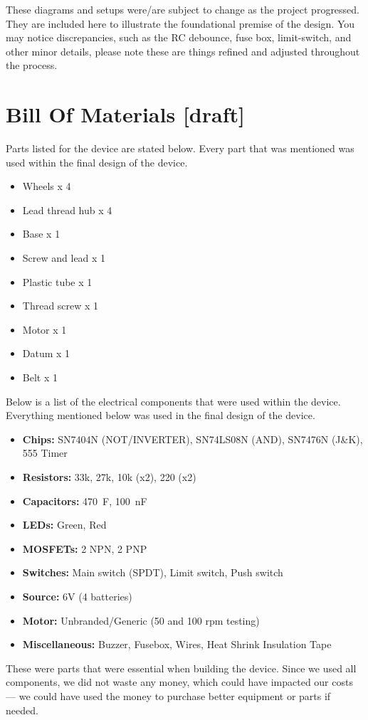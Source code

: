 \documentclass{article}
\begin{document}
These diagrams and setups were/are subject to change as the project progressed. They are included here to illustrate the foundational premise of the design. You may notice discrepancies, such as the RC debounce, fuse box, limit-switch, and other minor details, please note these are things refined and adjusted throughout the process.

\newpage\restoregeometry

\section{Bill Of Materials [draft]}
Parts listed for the device are stated below. Every part that was mentioned was used within the final design of the device.
\begin{itemize}[itemsep=-1mm]
	\item Wheels x 4
	\item Lead thread hub x 4
	\item Base x 1
	\item Screw and lead x 1
	\item Plastic tube x 1
	\item Thread screw x 1
	\item Motor x 1
	\item Datum x 1
	\item Belt x 1
\end{itemize}\noindent
Below is a list of the electrical components that were used within the device. Everything mentioned below was used in the final design of the device.
\begin{itemize}[itemsep=-1mm]
	\item \textbf{Chips:} SN7404N (NOT/INVERTER), SN74LS08N (AND), SN7476N (J\&K), 555 Timer
	\item \textbf{Resistors:} 33k, 27k, 10k (x2), 220 (x2)
	\item \textbf{Capacitors:} 470~\textmu F, 100~nF
	\item \textbf{LEDs:} Green, Red
	\item \textbf{MOSFETs:} 2 NPN, 2 PNP
	\item \textbf{Switches:} Main switch (SPDT), Limit switch, Push switch
	\item \textbf{Source:} 6V (4 batteries)
	\item \textbf{Motor:} Unbranded/Generic (50 and 100 rpm testing)
	\item \textbf{Miscellaneous:} Buzzer, Fusebox, Wires, Heat Shrink Insulation Tape
\end{itemize}
These were parts that were essential when building the device. Since we used all components, we did not waste any money, which could have impacted our costs — we could have used the money to purchase better equipment or parts if needed.
\end{document}
